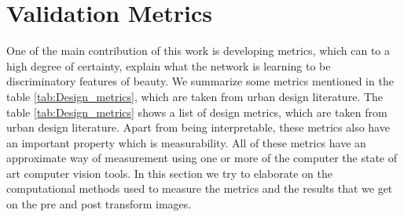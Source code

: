 \section{Validation Metrics}

One of the main contribution of this work is developing metrics, which can to a high degree of certainty, explain what the network is learning to be discriminatory features of beauty. We summarize some metrics mentioned in the table \ref{tab:Design_metrics}, which are taken from 
urban design literature. 
The table \ref{tab:Design_metrics} shows a list of design metrics, which are taken from urban design literature. Apart from being interpretable, these metrics also have an important property which is measurability. All of these metrics have an approximate way of measurement using one or more of the computer the state of art computer vision tools. In this section we try to elaborate on the computational methods used to measure the metrics and the results that we get on the pre and post transform images. 

